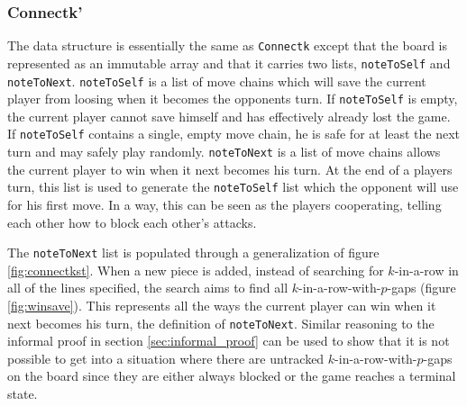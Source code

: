 \subsubsection{Connectk'}
The data structure is essentially the same as \texttt{Connectk} except that the board is represented as an immutable array and that it carries two lists, \texttt{noteToSelf} and \texttt{noteToNext}. \texttt{noteToSelf} is a list of move chains which will save the current player from loosing when it becomes the opponents turn. If \texttt{noteToSelf} is empty, the current player cannot save himself and has effectively already lost the game. If \texttt{noteToSelf} contains a single, empty move chain, he is safe for at least the next turn and may safely play randomly. \texttt{noteToNext} is a list of move chains allows the current player to win when it next becomes his turn. At the end of a players turn, this list is used to generate the \texttt{noteToSelf} list which the opponent will use for his first move. In a way, this can be seen as the players cooperating, telling each other how to block each other's attacks.

The \texttt{noteToNext} list is populated through a generalization of figure \ref{fig:connectkst}. When a new piece is added, instead of searching for $k$-in-a-row in all of the lines specified, the search aims to find all $k$-in-a-row-with-$p$-gaps (figure \ref{fig:winsave}). This represents all the ways the current player can win when it next becomes his turn, the definition of \texttt{noteToNext}. Similar reasoning to the informal proof in section \ref{sec:informal_proof} can be used to show that it is not possible to get into a situation where there are untracked $k$-in-a-row-with-$p$-gaps on the board since they are either always blocked or the game reaches a terminal state.


